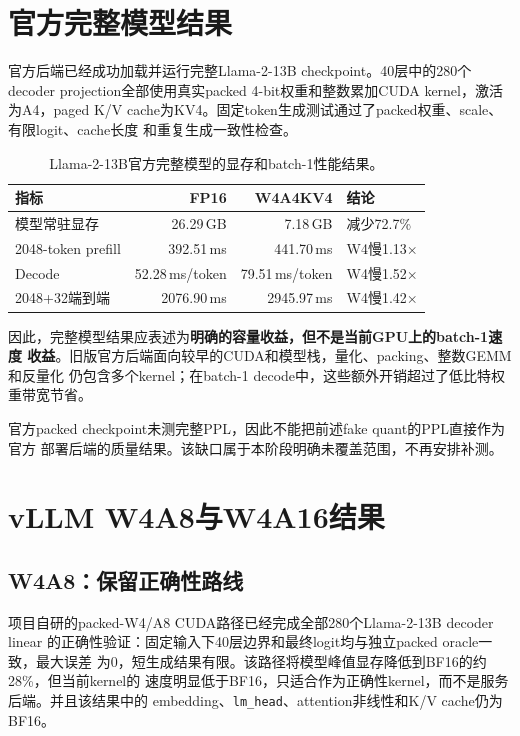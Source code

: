 \documentclass[11pt,a4paper]{ctexart}
\begin{document}
\section{官方完整模型结果}

官方后端已经成功加载并运行完整Llama-2-13B checkpoint。40层中的280个decoder
projection全部使用真实packed 4-bit权重和整数累加CUDA kernel，激活为A4，paged
K/V cache为KV4。固定token生成测试通过了packed权重、scale、有限logit、cache长度
和重复生成一致性检查。

\begin{table}[htbp]
  \centering
  \small
  \begin{tabular}{@{}lrrl@{}}
    \toprule
    指标 & FP16 & W4A4KV4 & 结论 \\
    \midrule
    模型常驻显存 & 26.29\,GB & 7.18\,GB & 减少72.7\% \\
    2048-token prefill & 392.51\,ms & 441.70\,ms & W4慢1.13$\times$ \\
    Decode & 52.28\,ms/token & 79.51\,ms/token & W4慢1.52$\times$ \\
    2048+32端到端 & 2076.90\,ms & 2945.97\,ms & W4慢1.42$\times$ \\
    \bottomrule
  \end{tabular}
  \caption{Llama-2-13B官方完整模型的显存和batch-1性能结果。}
\end{table}

因此，完整模型结果应表述为\textbf{明确的容量收益，但不是当前GPU上的batch-1速度
收益}。旧版官方后端面向较早的CUDA和模型栈，量化、packing、整数GEMM和反量化
仍包含多个kernel；在batch-1 decode中，这些额外开销超过了低比特权重带宽节省。

官方packed checkpoint未测完整PPL，因此不能把前述fake quant的PPL直接作为官方
部署后端的质量结果。该缺口属于本阶段明确未覆盖范围，不再安排补测。

\section{vLLM W4A8与W4A16结果}

\subsection*{W4A8：保留正确性路线}

项目自研的packed-W4/A8 CUDA路径已经完成全部280个Llama-2-13B decoder linear
的正确性验证：固定输入下40层边界和最终logit均与独立packed oracle一致，最大误差
为0，短生成结果有限。该路径将模型峰值显存降低到BF16的约28\%，但当前kernel的
速度明显低于BF16，只适合作为正确性kernel，而不是服务后端。并且该结果中的
embedding、\texttt{lm\_head}、attention非线性和K/V cache仍为BF16。
\end{document}
